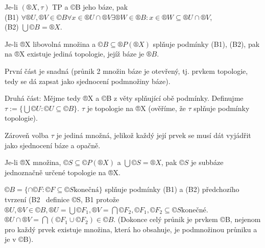 \documentclass[12pt]{article}					%
\begin{document}
    \begin{tvrzeni}
        Je-li $(®X, \tau)$ TP a ©B jeho báze, pak\\
        (B1) $\forall ®U, ®V \in ©B \forall x \in ®U \cap ®V \exists ®W \in ®B: x \in ®W \subseteq ®U \cap ®V$,\\
        (B2) $\bigcup ©B = ®X$.

        Je-li ®X libovolná množina a $©B \subseteq ®P(®X)$ splňuje podmínky (B1), (B2), pak na ®X existuje jediná topologie, jejíž báze je $®B$.

        \begin{dukazin}
            První část je snadná (průnik 2 množin báze je otevřený, tj. prvkem topologie, tedy se dá zapsat jako sjednocení podmnožiny báze).

            Druhá část: Mějme tedy ®X a ©B z věty splňující obě podmínky. Definujme $\tau := \{\bigcup ©U: ©U \subseteq ©B\}$. $\tau$ je topologie na ®X (ověříme, že $\tau$ splňuje podmínky topologie).

            Zároveň volba $\tau$ je jediná množná, jelikož každý její prvek se musí dát vyjádřit jako sjednocení báze a opačně.
        \end{dukazin}

        \begin{dusledekin}
            Je-li ®X množina, $©S \subseteq ©P(®X)$ a $\bigcup©S=®X$, pak $©S$ je subbáze jednoznačně určené topologie na ®X.
            \begin{dukazin}
                    $ ©B = \{\cap ©F: ©F \subseteq ©S \text{konečná}\} $ splňuje podmínky (B1) a (B2) předchozího tvrzení (B2 \ definice ©S, B1 protože $®U, ®V \in ©B, ®U = \bigcup ©F_1, ®V = \bigcap ©F_2, ©F_1, ©F_2 \subseteq ©S \text{konečné}$. $ ®U \cap ®V = \bigcap (©F_1 \cup ©F_2) \in ©B $. (Dokonce celý průnik je prvkem ©B, nejenom pro každý prvek existuje množina, která ho obsahuje, je podmnožinou průniku a je v ©B).
            \end{dukazin}
        \end{dusledekin}
    \end{tvrzeni}
\end{document}
